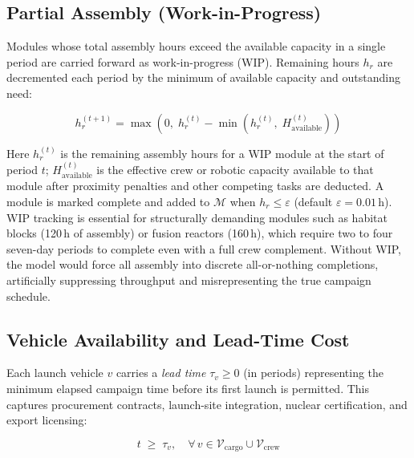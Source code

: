 \subsection{Partial Assembly (Work-in-Progress)}

Modules whose total assembly hours exceed the available capacity
in a single period are carried forward as work-in-progress (WIP).
Remaining hours $h_r$ are decremented each period by the minimum
of available capacity and outstanding need:

\begin{equation}
  h_r^{(t+1)} = \max\!\left(0,\;
    h_r^{(t)} - \min\!\left(h_r^{(t)},\; H_{\mathrm{available}}^{(t)}\right)
  \right)
\end{equation}

\noindent Here $h_r^{(t)}$ is the remaining assembly hours for
a WIP module at the start of period $t$; $H_{\mathrm{available}}^{(t)}$
is the effective crew or robotic capacity available to that module
after proximity penalties and other competing tasks are
deducted.
A module is marked complete and added to $\mathcal{M}$ when
$h_r \leq \varepsilon$ (default $\varepsilon = 0.01$\,h).
WIP tracking is essential for structurally demanding modules
such as habitat blocks (120\,h of assembly) or fusion reactors
(160\,h), which require two to four seven-day periods to complete
even with a full crew complement.
Without WIP, the model would force all assembly into discrete
all-or-nothing completions, artificially suppressing throughput
and misrepresenting the true campaign schedule.

\subsection{Vehicle Availability and Lead-Time Cost}

Each launch vehicle $v$ carries a \emph{lead time}
$\tau_v \geq 0$ (in periods) representing the minimum elapsed
campaign time before its first launch is permitted. This
captures procurement contracts, launch-site integration,
nuclear certification, and export licensing:

\begin{equation}
  t \;\geq\; \tau_v,
  \quad \forall\, v \in \mathcal{V}_{\mathrm{cargo}} \cup
  \mathcal{V}_{\mathrm{crew}}
  \label{eq:leadtime}
\end{equation}


